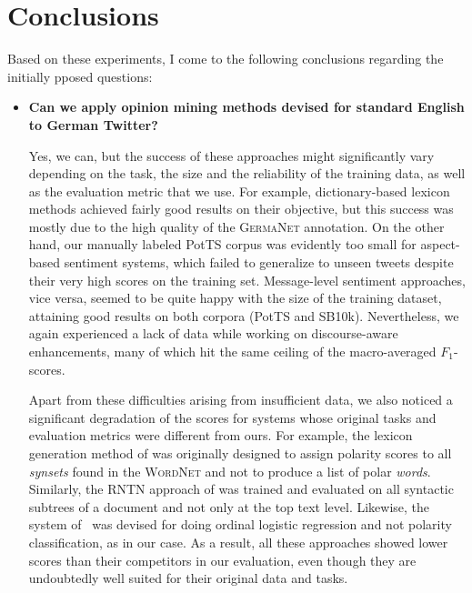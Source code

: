 \documentclass[11pt]{article}
\newcommand{\F}[0]{$F_1$}
\begin{document}
\section{Conclusions}

Based on these experiments, I come to the following conclusions
regarding the initially pposed questions:

\begin{itemize}
  \item\textbf{Can we apply opinion mining methods devised for
    standard English to German Twitter?}

    Yes, we can, but the success of these approaches might
    significantly vary depending on the task, the size and the
    reliability of the training data, as well as the evaluation metric
    that we use. For example, dictionary-based lexicon methods
    achieved fairly good results on their objective, but this success
    was mostly due to the high quality of the \textsc{GermaNet}
    annotation.  On the other hand, our manually labeled PotTS corpus
    was evidently too small for aspect-based sentiment systems, which
    failed to generalize to unseen tweets despite their very high
    scores on the training set.  Message-level sentiment approaches,
    vice versa, seemed to be quite happy with the size of the training
    dataset, attaining good results on both corpora (PotTS and SB10k).
    Nevertheless, we again experienced a lack of data while working on
    discourse-aware enhancements, many of which hit the same ceiling
    of the macro-averaged \F{}-scores.

    Apart from these difficulties arising from insufficient data, we
    also noticed a significant degradation of the scores for systems
    whose original tasks and evaluation metrics were different from
    ours.  For example, the lexicon generation method of
    \citet{Esuli:05} was originally designed to assign polarity scores
    to all \emph{synsets} found in the \textsc{WordNet} and not to
    produce a list of polar \emph{words}.  Similarly, the RNTN
    approach of \citet{Socher:13} was trained and evaluated on all
    syntactic subtrees of a document and not only at the top text
    level.  Likewise, the system of~\citet{Yessenalina:11} was devised
    for doing ordinal logistic regression and not polarity
    classification, as in our case.  As a result, all these approaches
    showed lower scores than their competitors in our evaluation, even
    though they are undoubtedly well suited for their original data
    and tasks.


\end{itemize}
\end{document}
